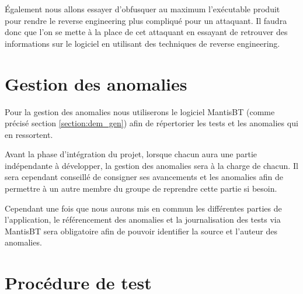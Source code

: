 Également nous allons essayer d'obfusquer au maximum l'exécutable produit pour rendre le reverse engineering
plus compliqué pour un attaquant. Il faudra donc que l'on se mette à la place de cet attaquant en essayant
de retrouver des informations sur le logiciel en utilisant des techniques de reverse engineering.


\chapter{Gestion des anomalies}
Pour la gestion des anomalies nous utiliserons le logiciel MantisBT (comme précisé section
\ref{section:dem_gen}) afin de répertorier les tests et les anomalies qui en ressortent.\newline

Avant la phase d'intégration du projet, lorsque chacun aura une partie indépendante à développer,
la gestion des anomalies sera à la charge de chacun. Il sera cependant conseillé de consigner ses
avancements et les anomalies afin de permettre à un autre membre du groupe de reprendre cette
partie si besoin.\newline

Cependant une fois que nous aurons mis en commun les différentes parties de l'application, le
référencement des anomalies et la journalisation des tests via MantisBT sera obligatoire afin de
pouvoir identifier la source et l'auteur des anomalies.


\chapter{Procédure de test}

